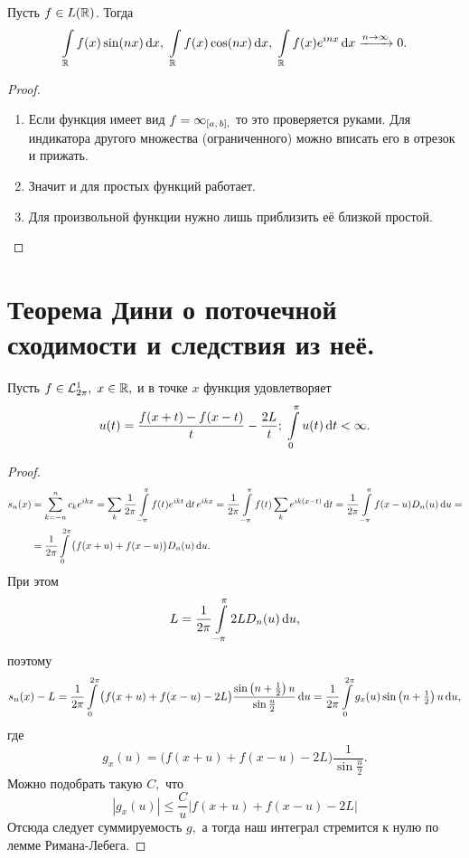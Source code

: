 \documentclass{notes}
\begin{document}
	\begin{lm}
		Пусть $f \in L(\mathbb{R})$. Тогда
		\[
			\int\limits_{\mathbb{R}} f(x) \sin(nx) \, \mathrm{d} x, \; \int\limits_{\mathbb{R}} f(x) \cos(nx) \, \mathrm{d} x, \; \int\limits_{\mathbb{R}} f(x) e^{inx} \, \mathrm{d} x \xrightarrow{n \to \infty} 0.
		\]
		\begin{proof}
			\begin{enumerate}
				\item Если функция имеет вид $f = \mathcal{1}_{[a, \, b],}$ то это проверяется руками. Для индикатора другого множества (ограниченного) можно вписать его в отрезок и прижать.
				\item Значит и для простых функций работает.
				\item Для произвольной функции нужно лишь приблизить её близкой простой.
			\end{enumerate}
		\end{proof}
	\end{lm}

\section{Теорема Дини о поточечной сходимости и следствия из неё.}

	\begin{thm}
		Пусть $f \in \mathcal{L}^1_{2\pi}, \; x \in \mathbb{R},$ и в точке $x$ функция удовлетворяет 
		\[
			u(t) = \dfrac{f(x + t) - f(x - t)}{t} - \dfrac{2 L}{t}\text{\text{;}} \; \int\limits_{0}^{\pi} u(t) \, \mathrm{d} t < \infty.
		\]
		\begin{proof}
			\begin{align*}
				s_n(x) &= \sum\limits_{k = -n}^{n} c_k e^{ikx} = \sum\limits_k \dfrac{1}{2\pi} \int\limits_{-\pi}^{\pi} f(t) e^{ikt} \, \mathrm{d} t \, e^{ikx} = \dfrac{1}{2\pi} \int\limits_{-\pi}^{\pi} f(t) \sum\limits_k e^{ik(x - t)} \, \mathrm{d} t = \dfrac{1}{2\pi}\int\limits_{-\pi}^{\pi} f(x - u) D_n(u)\, \mathrm{d} u = \\ &=\dfrac{1}{2\pi}\int\limits_{0}^{2\pi} \big(f(x + u) + f(x - u)\big) D_n(u) \, \mathrm{d} u. 
			\end{align*}
  			При этом
 			\[
 				L = \dfrac{1}{2\pi} \int\limits_{-\pi}^{\pi} 2L D_n(u) \, \mathrm{d} u,
 			\]
 			поэтому
 			\[
 				s_n(x) - L = \dfrac{1}{2\pi}\int\limits_{0}^{2\pi} \big(f(x + u) + f(x - u) - 2 L\big) \dfrac{\sin\left(n + \tfrac{1}{2}\right)u}{\sin\tfrac{u}{2}} \, \mathrm{d} u = \dfrac{1}{2\pi} \int\limits_{0}^{2\pi} g_x(u) \sin\left(n + \tfrac{1}{2}\right)u \, \mathrm{d} u,
 			\]
 			где
 			\[
 				g_x(u) = \big(f(x + u) + f(x - u) - 2 L\big) \dfrac{1}{\sin\tfrac{u}{2}}.
 			\]
 			Можно подобрать такую $C,$ что
 			\[
 				|g_x(u)| \leqslant \dfrac{C}{u} |f(x + u) + f(x - u) - 2 L|
 			\]
 			Отсюда следует суммируемость $g,$ а тогда наш интеграл стремится к нулю по лемме Римана-Лебега.
 		\end{proof}
	\end{thm}
\end{document}
